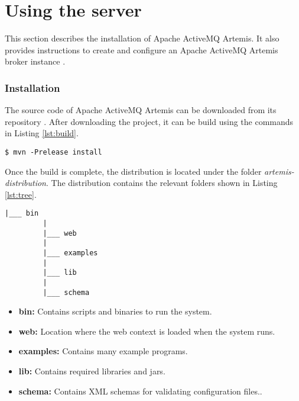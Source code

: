 \section{Using the server}

This section describes the installation of Apache ActiveMQ Artemis. It also provides instructions to create and configure an Apache ActiveMQ Artemis broker instance \parencite{artemis_server}.

\subsubsection{Installation}

The source code of Apache ActiveMQ Artemis can be downloaded from its repository \parencite{artemis_github}. After downloading the project, it can be build using the commands in Listing \ref{lst:build}.

\bigskip
\begin{lstlisting}[style=BashInputStyle,caption=Building Apache ActiveMQ Artemis, label={lst:build}]
  $ mvn -Prelease install
\end{lstlisting}

Once the build is complete, the distribution is located under the folder \textit{artemis-distribution}.
The distribution contains the relevant folders shown in Listing \ref{lst:tree}.

\begin{lstlisting}[style=Tree,caption=Apache ActiveMQ Artemis Folders, label={lst:tree}]
         |___ bin
         |
         |___ web
         |
         |___ examples
         |
         |___ lib
         |
         |___ schema
\end{lstlisting}

\begin{itemize}
    \item \textbf{bin:}
        Contains scripts and binaries to run the system.

    \item \textbf{web:}
        Location where the web context is loaded when the system runs.

    \item \textbf{examples:}
        Contains many example programs.

    \item \textbf{lib:}
        Contains required libraries and jars.

    \item \textbf{schema:}
        Contains XML schemas for validating configuration files..
         
\end{itemize}


